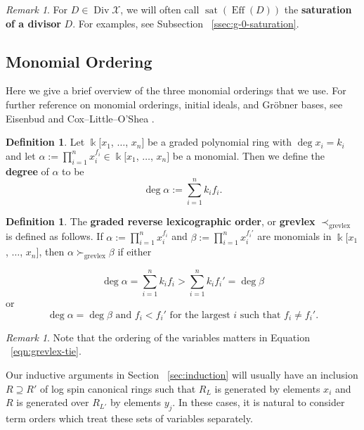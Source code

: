 \documentclass{amsart}
\theoremstyle{plain}
\theoremstyle{definition}
\newtheorem{defn}[thm]{Definition}
\theoremstyle{remark}
\newtheorem{rem}[thm]{Remark}
\numberwithin{equation}{section}
\newcommand\ssec{\subsection}
\newcommand\Bk{{\Bbbk}}
\DeclareMathOperator\di{Div}
\newcommand\sx{\mathscr X}
\newcommand{\halfcan}{L}
\DeclareMathOperator{\Eff}{Eff}
\DeclareMathOperator{\sat}{sat}
\begin{document}
\begin{rem}
For $D \in \di \sx$, we will often call $\sat(\Eff(D))$ the
\textbf{saturation of a divisor} $D$. For examples,
see Subsection ~\ref{ssec:g-0-saturation}.
\end{rem}

\ssec{Monomial Ordering}
\label{ssec:monomial-order}
Here we give a brief overview of the three monomial orderings
that we use. For further reference on monomial orderings,
initial ideals, and Gr\"{o}bner bases, see Eisenbud
\cite[Section 15.9]{eisenbud:comm-alg} and Cox--Little--O'Shea
\cite[Chapter 2]{cls:ideals-varieties-algorithms}.

\begin{defn}
\label{defn:monomial-degree}
Let $\Bk[x_1$, $\ldots$, $x_n]$ be a graded polynomial
ring with $\deg x_i = k_i$ and let $\alpha := \prod_{i = 1}^{n} x_{i}^{f_i} \in
\Bk[x_{1}$, $\ldots$, $x_{n}]$ be a monomial. Then
we define the {\bf degree} of $\alpha$ to be
\[
	\deg \alpha := \sum_{i = 1}^{n} k_i f_i.
\]
\end{defn}

\begin{defn}
\label{defn:grevlex}
The {\bf graded reverse lexicographic order}, or {\bf grevlex} $\prec_{\text{grevlex}}$ is defined as follows.
If $\alpha := \prod_{i = 1}^{n} x_{i}
^{f_i}$ and $\beta := \prod_{i = 1}^{n} x_{i}^{f_i'}$ are
monomials in $\Bk[x_{1}$, $\ldots$, $x_{n}]$, then $\alpha
\succ_{\text{grevlex}} \beta$ if either

\begin{equation}
	\deg \alpha = \sum_{i = 1}^{n} k_i f_i  > \sum_{i = 1}^{n} k_i f_i' = \deg \beta
\end{equation}
or
\begin{equation}
\label{eqn:grevlex-tie}
	\deg \alpha = \deg \beta \text{ and }	f_i < f_i' \text{ for
	the	largest } i \text{ such that } f_i \neq f_i'.
\end{equation}
\end{defn}

\begin{rem}
Note that the ordering of the variables matters in Equation
~\ref{eqn:grevlex-tie}.
\end{rem}

Our inductive arguments in Section ~\ref{sec:induction} will
usually have an inclusion $R \supseteq R'$ of log spin canonical
rings such that $R_\halfcan$ is generated by elements $x_{i}$ and $R$
is generated over $R_{\halfcan'}$ by elements $y_j$. In these cases, it is
natural to consider term orders which treat these sets of variables
separately.
\end{document}
